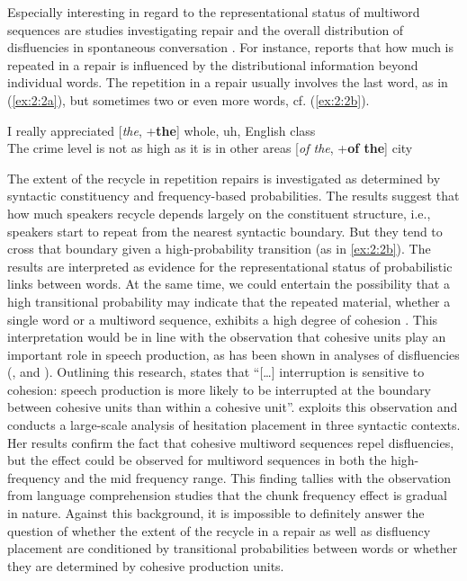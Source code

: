 Especially interesting in regard to the representational status of multiword sequences are studies investigating repair and the overall distribution of disfluencies in spontaneous conversation \citep[e.g.,][]{schneider2014}. For instance, \citet{kapatsinski2005} reports that how much is repeated in a repair is influenced by the distributional information beyond individual words. The repetition in a repair usually involves the last word, as in (\ref{ex:2:2a}), but sometimes two or even more words, cf. (\ref{ex:2:2b}).

\ea
    \ea
	\label{ex:2:2a}
	I really appreciated [\textit{the}, +\textbf{the}] whole, uh, English class\\

    \ex
	\label{ex:2:2b}
	The crime level is not as high as it is in other areas [\textit{of the}, +\textbf{of the}] city
	\hfill\hbox{\citep[][481]{kapatsinski2005}}
	\z
\z

\noindent The extent of the recycle in repetition repairs is investigated as determined by syntactic constituency and frequency-based probabilities. The results suggest that how much speakers recycle depends largely on the constituent structure, i.e., speakers start to repeat from the nearest syntactic boundary. But they tend to cross that boundary given a high-probability transition (as in \ref{ex:2:2b}). The results are interpreted as evidence for the representational status of probabilistic links between words. At the same time, we could entertain the possibility that a high transitional probability may indicate that the repeated material, whether a single word or a multiword sequence, exhibits a high degree of cohesion \citep[for the effect of frequency on interruptibility of words, see][]{kapatsinski2010}. This interpretation would be in line with the observation that cohesive units play an important role in speech production, as has been shown in analyses of disfluencies (\citealt[for reviews, see][74--75]{kapatsinski2010}, and \citealt[][]{schneider2014}). Outlining this research, \citet[][75]{kapatsinski2010} states that ``[\dots] interruption is sensitive to cohesion: speech production is more likely to be interrupted at the boundary between cohesive units than within a cohesive unit''. \citet{schneider2014} exploits this observation and conducts a large-scale analysis of hesitation placement in three syntactic contexts. Her results confirm the fact that cohesive multiword sequences repel disfluencies, but the effect could be observed for multiword sequences in both the high-frequency and the mid frequency range. This finding tallies with the observation from language comprehension studies \citep[cf.][]{reali-christiansen,arnon-snider} that the chunk frequency effect is gradual in nature. Against this background, it is impossible to definitely answer the question of whether the extent of the recycle in a repair as well as disfluency placement are conditioned by transitional probabilities between words or whether they are determined by cohesive production units.

